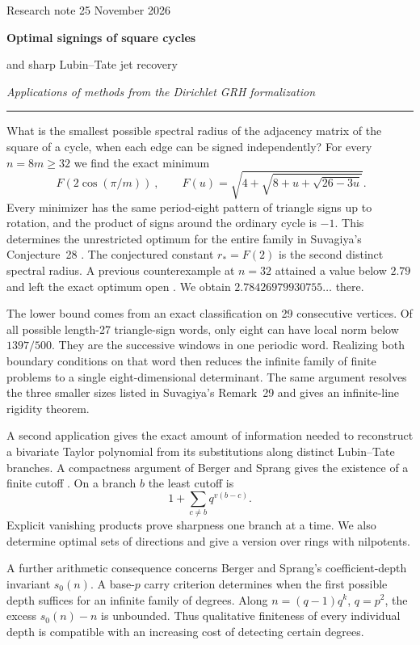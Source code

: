 \documentclass[11pt,letterpaper]{article}
\begin{document}
\thispagestyle{plain}
{\large\sffamily\color{accent}Research note \hfill 25 November 2026}\par
\vspace{0.5em}
{\fontsize{24.88}{30}\selectfont\bfseries\color{ink}Optimal signings of square cycles\par
and sharp Lubin--Tate jet recovery\par}
{\large\itshape Applications of methods from the Dirichlet GRH formalization}\par
\vspace{0.45em}\hrule\vspace{0.6em}
What is the smallest possible spectral radius of the adjacency matrix of the square of a cycle, when each edge can be signed independently?
For every $n=8m\ge32$ we find the exact minimum
\[
 \boxed{\ F(2\cos(\pi/m))\ },\qquad
 F(u)=\sqrt{4+\sqrt{8+u+\sqrt{26-3u}}}.
\]
Every minimizer has the same period-eight pattern of triangle signs up to rotation, and the product of signs around the ordinary cycle is $-1$. This determines the unrestricted optimum for the entire family in Suvagiya's Conjecture~28 \cite{Suvagiya}. The conjectured constant $r_*=F(2)$ is the second distinct spectral radius. A previous counterexample at $n=32$ attained a value below $2.79$ and left the exact optimum open \cite{Trure}. We obtain $2.78426979930755\ldots$ there.

The lower bound comes from an exact classification on 29 consecutive vertices. Of all possible length-27 triangle-sign words, only eight can have local norm below $1397/500$. They are the successive windows in one periodic word. Realizing both boundary conditions on that word then reduces the infinite family of finite problems to a single eight-dimensional determinant. The same argument resolves the three smaller sizes listed in Suvagiya's Remark~29 and gives an infinite-line rigidity theorem.

A second application gives the exact amount of information needed to reconstruct a bivariate Taylor polynomial from its substitutions along distinct Lubin--Tate branches. A compactness argument of Berger and Sprang gives the existence of a finite cutoff \cite{BS}. On a branch $b$ the least cutoff is
\[
                 1+\sum_{c\ne b}q^{v(b-c)}.
\]
Explicit vanishing products prove sharpness one branch at a time. We also determine optimal sets of directions and give a version over rings with nilpotents.

A further arithmetic consequence concerns Berger and Sprang's coefficient-depth invariant $s_0(n)$. A base-$p$ carry criterion determines when the first possible depth suffices for an infinite family of degrees. Along $n=(q-1)q^k$, $q=p^2$, the excess $s_0(n)-n$ is unbounded. Thus qualitative finiteness of every individual depth is compatible with an increasing cost of detecting certain degrees.
\end{document}
